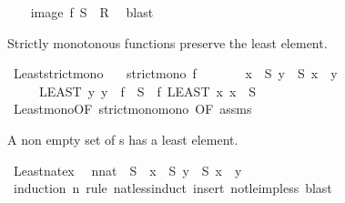 \begin{isabellebody}
\isanewline
\ \ \isamarkupfalse%
\ {\isacartoucheopen}image\ f\ {\isacharquery}S\ {\isasymsubseteq}\ {\isacharquery}R{\isacartoucheclose}\ \isamarkupfalse%
\ blast\isanewline
{}\isamarkupfalse%
%
\endisatagproof
{\isafoldproof}%
%
\isadelimproof
%
\endisadelimproof
%
\begin{isamarkuptext}%
Strictly monotonous functions preserve the least element.%
\end{isamarkuptext}\isamarkuptrue%
\isamarkupfalse%
\ Least{\isacharunderscore}strict{\isacharunderscore}mono{\isacharcolon}\isanewline
\ \ \ {\isacartoucheopen}strict{\isacharunderscore}mono\ f{\isacartoucheclose}\isanewline
\ \ \ \ \ \ \ {\isacartoucheopen}{\isasymexists}x\ {\isasymin}\ S{\isachardot}\ {\isasymforall}y\ {\isasymin}\ S{\isachardot}\ x\ {\isasymle}\ y{\isacartoucheclose}\isanewline
\ \ \ \ \ {\isacartoucheopen}{\isacharparenleft}LEAST\ y{\isachardot}\ y\ {\isasymin}\ f\ {\isacharbackquote}\ S{\isacharparenright}\ {\isacharequal}\ f\ {\isacharparenleft}LEAST\ x{\isachardot}\ x\ {\isasymin}\ S{\isacharparenright}{\isacartoucheclose}\isanewline
%
\isadelimproof
%
\endisadelimproof
%
\isatagproof
{}\isamarkupfalse%
\ Least{\isacharunderscore}mono{\isacharbrackleft}OF\ strict{\isacharunderscore}mono{\isacharunderscore}mono{\isacharcomma}\ OF\ assms{\isacharbrackright}\ \isacommand{{\isachardot}}\isamarkupfalse%
%
\endisatagproof
{\isafoldproof}%
%
\isadelimproof
%
\endisadelimproof
%
\begin{isamarkuptext}%
A non empty set of s has a least element.%
\end{isamarkuptext}\isamarkuptrue%
\isamarkupfalse%
\ Least{\isacharunderscore}nat{\isacharunderscore}ex{\isacharcolon}\isanewline
\ \ {\isacartoucheopen}{\isacharparenleft}n{\isacharcolon}{\isacharcolon}nat{\isacharparenright}\ {\isasymin}\ S\ {\isasymLongrightarrow}\ {\isasymexists}x\ {\isasymin}\ S{\isachardot}\ {\isacharparenleft}{\isasymforall}y\ {\isasymin}\ S{\isachardot}\ x\ {\isasymle}\ y{\isacharparenright}{\isacartoucheclose}\isanewline
%
\isadelimproof
%
\endisadelimproof
%
\isatagproof
{}\isamarkupfalse%
\ {\isacharparenleft}induction\ n\ rule{\isacharcolon}\ nat{\isacharunderscore}less{\isacharunderscore}induct{\isacharcomma}\ insert\ not{\isacharunderscore}le{\isacharunderscore}imp{\isacharunderscore}less{\isacharcomma}\ blast{\isacharparenright}%
\endisatagproof
{\isafoldproof}%
%
\isadelimproof
%
\endisadelimproof

\end{isabellebody}
